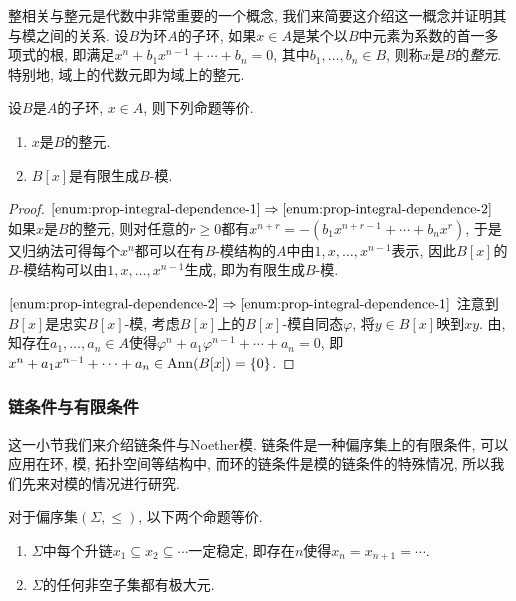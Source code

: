 整相关与整元是代数中非常重要的一个概念, 我们来简要这介绍这一概念并证明其与模之间的关系. 设$B$为环$A$的子环, 如果$x\in A$是某个以$B$中元素为系数的首一多项式的根, 即满足$x^n+b_1x^{n-1}+\dotsb +b_n=0$, 其中$b_1, \dotsc, b_n\in B$, 则称$x$是$B$的\emph{整元}. 特别地, 域上的代数元即为域上的整元.

\begin{proposition}\label{prop:integraldependence}
  设$B$是$A$的子环, $x\in A$, 则下列命题等价.
  \begin{enumerate}
    \item\label{enum:prop-integral-dependence-1} $x$是$B$的整元.
    \item\label{enum:prop-integral-dependence-2} $B[x]$是有限生成$B$-模.
  \end{enumerate}
\end{proposition}

\begin{proof}
  $\ref{enum:prop-integral-dependence-1}\Rightarrow\ref{enum:prop-integral-dependence-2}$ 如果$x$是$B$的整元, 则对任意的$r\geq 0$都有$x^{n+r}=-(b_1x^{n+r-1}+\dotsb +b_nx^r)$, 于是又归纳法可得每个$x^n$都可以在有$B$-模结构的$A$中由$1, x, \dotsc, x^{n-1}$表示, 因此$B[x]$的$B$-模结构可以由$1, x, \dotsc, x^{n-1}$生成, 即为有限生成$B$-模.

  $\ref{enum:prop-integral-dependence-2}\Rightarrow\ref{enum:prop-integral-dependence-1}$ 注意到$B[x]$是忠实$B[x]$-模, 考虑$B[x]$上的$B[x]$-模自同态$\varphi$, 将$y\in B[x]$映到$xy$. 由, 知存在$a_1, \dotsc, a_n\in A$使得$\varphi^n +a_1\varphi^{n-1}+\dotsb +a_n=0$, 即$x^n +a_1x^{n-1}+\dotsb +a_n\in \operatorname{Ann} (B[x])=\{0\}$.
\end{proof}


\subsubsection{链条件与有限条件}

这一小节我们来介绍链条件与Noether模. 链条件是一种偏序集上的有限条件, 可以应用在环, 模, 拓扑空间等结构中, 而环的链条件是模的链条件的特殊情况, 所以我们先来对模的情况进行研究.

\begin{proposition}\label{prop:chaincondition}
  对于偏序集$(\Sigma, \leq)$, 以下两个命题等价.
  \begin{enumerate}
    \item\label{enum:prop-chain-condition-chain} $\Sigma$中每个升链$x_1\subseteq x_2\subseteq\dotsb$一定稳定, 即存在$n$使得$x_n=x_{n+1}=\dotsb$.
    \item\label{enum:prop-chain-condition-maximal} $\Sigma$的任何非空子集都有极大元.
  \end{enumerate}
\end{proposition}

